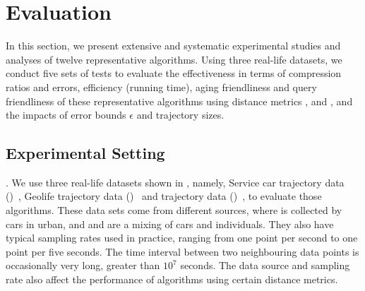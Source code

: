 \section{Evaluation} %
\label{sec-exp}
In this section, we present extensive and systematic experimental studies and analyses of twelve representative \lsa algorithms.
Using three real-life datasets, we conduct five sets of tests to evaluate the effectiveness in terms of compression ratios and errors, efficiency (running time), aging friendliness and query friendliness of these representative algorithms using distance metrics \ped, \sed and \dad, and the impacts of error bounds $\epsilon$ and trajectory sizes.
%

\subsection{Experimental Setting}

.
We use three real-life datasets shown in , namely, Service car trajectory data (\ucar)~\cite{Lin:Cised}, Geolife trajectory data (\geolife)~\cite{Web:Geolife} and \mopsi trajectory data (\mopsi)~\cite{Web:Mopsi}, to evaluate those \lsa algorithms.
These data sets come from different sources, where \ucar is collected by cars in urban, and \geolife and \mopsi are a mixing of cars and individuals. They also have typical sampling rates used in practice, ranging from one point per second to one point per five seconds.
{The time interval between two neighbouring data points is occasionally very long, \eg greater than $10^7$ seconds.}
The data source and sampling rate also affect the performance of \lsa algorithms using certain distance metrics.


